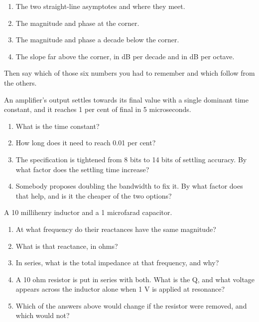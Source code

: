 \begin{enumerate}
  \item The two straight-line asymptotes and where they meet.
  \item The magnitude and phase at the corner.
  \item The magnitude and phase a decade below the corner.
  \item The slope far above the corner, in dB per decade and in dB per octave.
\end{enumerate}
Then say which of those six numbers you had to remember and which follow from the others.

\label{c2:ex:3}
An amplifier's output settles towards its final value with a single dominant time constant, and it reaches 1 per cent of final in 5 microseconds.

\begin{enumerate}
  \item What is the time constant?
  \item How long does it need to reach 0.01 per cent?
  \item The specification is tightened from 8 bits to 14 bits of settling accuracy. By what factor does the settling time increase?
  \item Somebody proposes doubling the bandwidth to fix it. By what factor does that help, and is it the cheaper of the two options?
\end{enumerate}

\label{c2:ex:4}
A 10 millihenry inductor and a 1 microfarad capacitor.

\begin{enumerate}
  \item At what frequency do their reactances have the same magnitude?
  \item What is that reactance, in ohms?
  \item In series, what is the total impedance at that frequency, and why?
  \item A 10 ohm resistor is put in series with both. What is the Q, and what voltage appears across the inductor alone when 1 V is applied at resonance?
  \item Which of the answers above would change if the resistor were removed, and which would not?
\end{enumerate}

